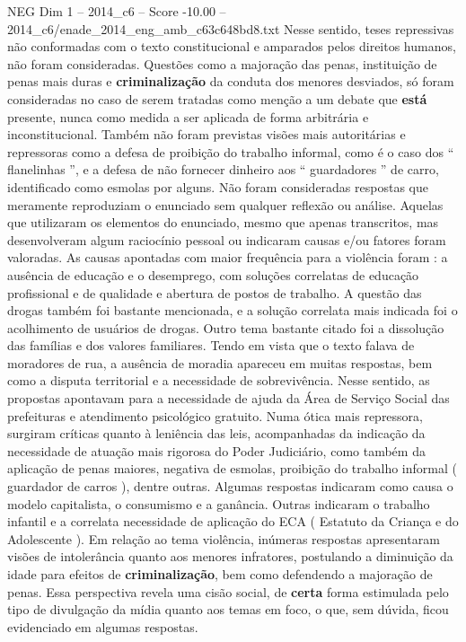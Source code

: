 \begin{textsample}{NEG Dim 1 – 2014\_c6 – Score -10.00 – 2014\_c6/enade\_2014\_eng\_amb\_c63c648bd8.txt}
Nesse sentido, teses repressivas não conformadas com o texto constitucional e amparados pelos direitos humanos, não foram consideradas.
Questões como a majoração das penas, instituição de penas mais duras e \textbf{criminalização} da conduta dos menores desviados, só foram consideradas no caso de serem tratadas como menção a um debate que \textbf{está} presente, nunca como medida a ser aplicada de forma arbitrária e inconstitucional.
Também não foram previstas visões mais autoritárias e repressoras como a defesa de proibição do trabalho informal, como é o caso dos “ flanelinhas ”, e a defesa de não fornecer dinheiro aos “ guardadores ” de carro, identificado como esmolas por alguns.
Não foram consideradas respostas que meramente reproduziam o enunciado sem qualquer reflexão ou análise.
Aquelas que utilizaram os elementos do enunciado, mesmo que apenas transcritos, mas desenvolveram algum raciocínio pessoal ou indicaram causas e/ou fatores foram valoradas.
As causas apontadas com maior frequência para a violência foram : a ausência de educação e o desemprego, com soluções correlatas de educação profissional e de qualidade e abertura de postos de trabalho.
A questão das drogas também foi bastante mencionada, e a solução correlata mais indicada foi o acolhimento de usuários de drogas.
Outro tema bastante citado foi a dissolução das famílias e dos valores familiares.
Tendo em vista que o texto falava de moradores de rua, a ausência de moradia apareceu em muitas respostas, bem como a disputa territorial e a necessidade de sobrevivência.
Nesse sentido, as propostas apontavam para a necessidade de ajuda da Área de Serviço Social das prefeituras e atendimento psicológico gratuito.
Numa ótica mais repressora, surgiram críticas quanto à leniência das leis, acompanhadas da indicação da necessidade de atuação mais rigorosa do Poder Judiciário, como também da aplicação de penas maiores, negativa de esmolas, proibição do trabalho informal ( guardador de carros ), dentre outras.
Algumas respostas indicaram como causa o modelo capitalista, o consumismo e a ganância.
Outras indicaram o trabalho infantil e a correlata necessidade de aplicação do ECA ( Estatuto da Criança e do Adolescente ).
Em relação ao tema violência, inúmeras respostas apresentaram visões de intolerância quanto aos menores infratores, postulando a diminuição da idade para efeitos de \textbf{criminalização}, bem como defendendo a majoração de penas.
Essa perspectiva revela uma cisão social, de \textbf{certa} forma estimulada pelo tipo de divulgação da mídia quanto aos temas em foco, o que, sem dúvida, ficou evidenciado em algumas respostas.

\end{textsample}
